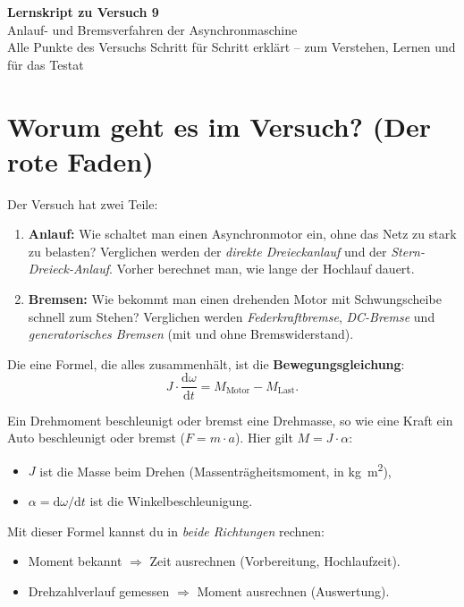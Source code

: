 \documentclass[11pt,a4paper]{article}
\begin{document}
\sloppy
\begin{center}
{\LARGE\bfseries Lernskript zu Versuch 9}\\[4pt]
{\Large Anlauf- und Bremsverfahren der Asynchronmaschine}\\[6pt]
{\normalsize Alle Punkte des Versuchs Schritt für Schritt erklärt -- zum Verstehen, Lernen und für das Testat}
\end{center}
\tableofcontents
\newpage

\section{Worum geht es im Versuch? (Der rote Faden)}
Der Versuch hat zwei Teile:
\begin{enumerate}
\item \textbf{Anlauf:} Wie schaltet man einen Asynchronmotor ein, ohne das Netz zu stark
  zu belasten? Verglichen werden der \emph{direkte Dreieckanlauf} und der
  \emph{Stern-Dreieck-Anlauf}. Vorher berechnet man, wie lange der Hochlauf dauert.
\item \textbf{Bremsen:} Wie bekommt man einen drehenden Motor mit Schwungscheibe schnell
  zum Stehen? Verglichen werden \emph{Federkraftbremse}, \emph{DC-Bremse} und
  \emph{generatorisches Bremsen} (mit und ohne Bremswiderstand).
\end{enumerate}
Die eine Formel, die alles zusammenhält, ist die \textbf{Bewegungsgleichung}:
\[
  J\cdot\frac{\mathrm d\omega}{\mathrm dt} = M_\mathrm{Motor} - M_\mathrm{Last}.
\]
\begin{einfach}
Ein Drehmoment beschleunigt oder bremst eine Drehmasse, so wie eine Kraft ein Auto
beschleunigt oder bremst ($F = m\cdot a$). Hier gilt $M = J\cdot\alpha$:
\begin{itemize}
\item $J$ ist die \glqq Masse beim Drehen\grqq{} (Massenträgheitsmoment, in \si{kg.m^2}),
\item $\alpha = \mathrm d\omega/\mathrm dt$ ist die Winkelbeschleunigung.
\end{itemize}
Mit dieser Formel kannst du in \emph{beide Richtungen} rechnen:
\begin{itemize}
\item Moment bekannt $\Rightarrow$ Zeit ausrechnen (Vorbereitung, Hochlaufzeit).
\item Drehzahlverlauf gemessen $\Rightarrow$ Moment ausrechnen (Auswertung).
\end{itemize}
\end{einfach}
\end{document}
